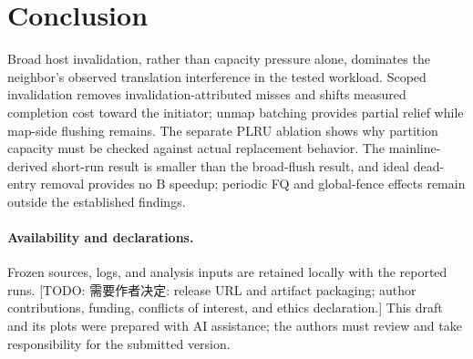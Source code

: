 \documentclass[sigconf,nonacm]{acmart}
\newcommand{\todo}[1]{{\color{brown}\textsf{[TODO: #1]}}}
\newcommand{\claim}[1]{} %
\begin{document}
\section{Conclusion}
Broad host invalidation, rather than capacity pressure alone, dominates the neighbor's observed translation interference in the tested workload.\claim{C106}
Scoped invalidation removes invalidation-attributed misses and shifts measured completion cost toward the initiator; unmap batching provides partial relief while map-side flushing remains.\claim{C107}
The separate PLRU ablation shows why partition capacity must be checked against actual replacement behavior.\claim{C108}
The mainline-derived short-run result is smaller than the broad-flush result, and ideal dead-entry removal provides no B speedup; periodic FQ and global-fence effects remain outside the established findings.\claim{N023}

\paragraph{Availability and declarations.}
Frozen sources, logs, and analysis inputs are retained locally with the reported runs.\claim{C109}
\todo{需要作者决定: release URL and artifact packaging; author contributions, funding, conflicts of interest, and ethics declaration.}
This draft and its plots were prepared with AI assistance; the authors must review and take responsibility for the submitted version.\claim{C110}



\end{document}
